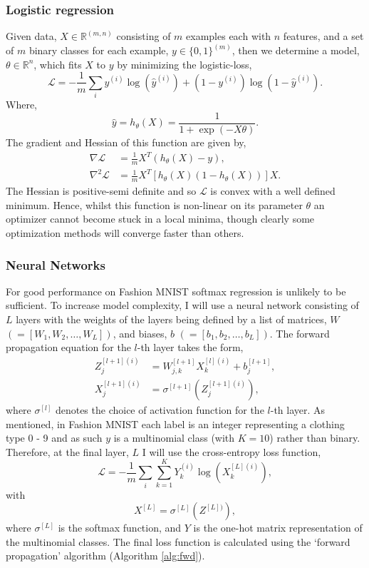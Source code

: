 \documentclass[nohyperref]{article}
\theoremstyle{plain}
\theoremstyle{definition}
\theoremstyle{remark}
\begin{document}
\subsubsection*{Logistic regression}
Given data, $X \in \mathbb{R}^{(m,n)}$ consisting of $m$ examples each with $n$ features, and a set of $m$ binary classes for each example, $y\in \{0,1\}^{(m)}$, then we determine a model, $\theta \in \mathbb{R}^n$, which fits $X$ to $y$ by minimizing the logistic-loss, 
\begin{equation}
\mathcal{L}=-\frac{1}{m}\sum_{i}y^{(i)}\log{(\widehat{y}^{(i)})}+(1-y^{(i)})\log{(1-\widehat{y}^{(i)})}.\label{logistic_func}
\end{equation}
Where,
\begin{equation}
\widehat{y}=h_{\theta}(X)=\frac{1}{1+\exp(-X \theta)}.
\end{equation}
The gradient and Hessian of this function are given by,
\begin{align}
\nabla \mathcal{L}&=\frac{1}{m}X^{T}(h_{\theta}(X)-y),\\
\nabla^2 \mathcal{L}&=\frac{1}{m}X^{T}[h_{\theta}(X)(1-h_{\theta}(X))]X.
\end{align}
The Hessian is positive-semi definite and so $\mathcal{L}$ is convex with a well defined minimum. Hence, whilst this function is non-linear on its parameter $\theta$ an optimizer cannot become stuck in a local minima, though clearly some optimization methods will converge faster than others.

\subsubsection*{Neural Networks}
For good performance on Fashion MNIST softmax regression is unlikely to be sufficient. To increase model complexity, I will use a neural network consisting of $L$ layers with the weights of the layers being defined by a list of matrices, $W$ $(=[W_1,W_2,\ldots,W_L])$, and biases, $b$ $(=[b_1,b_2,\ldots,b_L])$. The forward propagation equation for the $l$-th layer takes the form,
\begin{align}
Z^{[l+1](i)}_j&=W^{[l+1]}_{j,k}X^{[l](i)}_k+b^{[l+1]}_j,  \label{propZ}\\
X^{[l+1](i)}_j&=\sigma^{[l+1]}(Z^{[l+1](i)}_j)\label{propX},
\end{align}
where $\sigma^{[l]}$ denotes the choice of activation function for the $l$-th layer. As mentioned, in Fashion MNIST each label is an integer representing a clothing type 0 - 9 and as such $y$ is a multinomial class (with $K=10$) rather than binary.  Therefore, at  the final layer, $L$ I will use the cross-entropy loss function,
\begin{equation}
\mathcal{L}=-\frac{1}{m}\sum_{i}\sum_{k=1}^{K} Y^{(i)}_k\log{(X^{[L](i)}_k)},\label{celossfunc}
\end{equation}
with
\begin{equation}
X^{[L]}=\sigma^{[L]}{(Z^{[L])})},
\end{equation}
where $\sigma^{[L]}$ is the softmax function, and $Y$ is the one-hot matrix representation of the multinomial classes. The final loss function is calculated using the `forward propagation' algorithm (Algorithm \ref{alg:fwd}).
\end{document}

